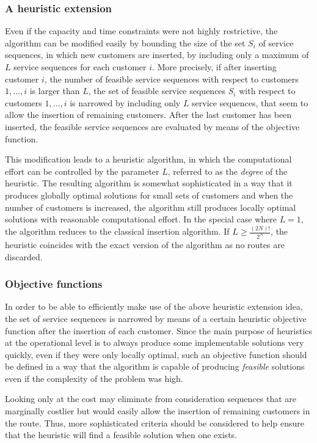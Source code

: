 \documentclass[dissertation,draft*]{aaltoseries}
\begin{document}
\subsubsection{A heuristic extension}
\label{svheuristic}
Even if the capacity and time constraints were not highly restrictive, the algorithm can be 
modified easily by bounding the size of the set $S_i$ 
of service sequences, in which new customers are inserted, 
by including only a maximum of $L$ service sequences
for each customer $i$. More precisely, if after inserting 
customer $i$, the number of feasible service sequences with respect to customers $1,\ldots, i$
is larger than $L$, the set of feasible service sequences $S_i$ with respect to 
customers $1,\ldots, i$ is narrowed by including only $L$  
service sequences, that seem to allow the insertion of remaining customers.
After the last customer has been inserted, the feasible service sequences are evaluated
by means of the objective function.

This modification leads to a heuristic algorithm, in which the computational
effort can be controlled by the parameter $L$, referred to as the \emph{degree} of
the heuristic. The resulting algorithm is
somewhat sophisticated in a way that it produces globally optimal solutions for
small sets of customers and when the number of customers is increased, the
algorithm still produces locally optimal solutions with 
reasonable computational effort. In the special case where $L=1$, the
algorithm reduces to the classical insertion algorithm. 
If $L \geq \frac{(2N)!}{2^N}$, the heuristic coincides with the exact version of the 
algorithm as no routes are discarded.

\subsubsection{Objective functions}
\label{hobjfunc}
In order to be able to efficiently make use of the above heuristic extension
idea, the set of service sequences is narrowed by means of a certain heuristic objective function
after the insertion of each customer.
Since the main purpose of heuristics at the operational level is to always produce some implementable 
solutions very quickly, even if they were only locally optimal, such an objective function should 
be defined in a way that the algorithm is 
capable of producing \emph{feasible} solutions even if the complexity of the problem was high. %

Looking only at the cost may eliminate from consideration
sequences that are marginally costlier but would easily allow the
insertion of remaining customers in the route. 
Thus, more sophisticated criteria should be considered to help ensure that the heuristic will
find a feasible solution when one exists.
\end{document}
